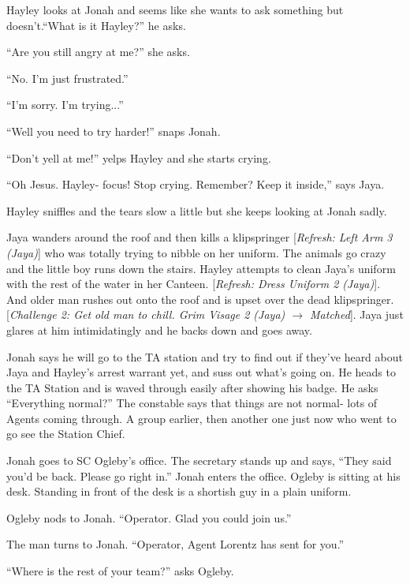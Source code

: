 Hayley looks at Jonah and seems like she wants to ask something but doesn't.``What is it Hayley?'' he asks.

``Are you still angry at me?'' she asks.

``No.  I'm just frustrated.''

``I'm sorry.  I'm trying...''

``Well you need to try harder!'' snaps Jonah.

``Don't yell at me!'' yelps Hayley and she starts crying.

``Oh Jesus.  Hayley- focus!  Stop crying.  Remember?  Keep it inside,'' says Jaya.

Hayley sniffles and the tears slow a little but she keeps looking at Jonah sadly.



Jaya wanders around the roof and then kills a klipspringer {[}\textit{Refresh: Left Arm 3 (Jaya)}{]} who was totally trying to nibble on her uniform.  The animals go crazy and the little boy runs down the stairs.  Hayley attempts to clean Jaya's uniform with the rest of the water in her Canteen.  {[}\textit{Refresh: Dress Uniform 2 (Jaya)}{]}. And older man rushes out onto the roof and is upset over the dead klipspringer.   {[}\textit{Challenge 2: Get old man to chill.  Grim Visage 2 (Jaya) $\rightarrow$ Matched}{]}.  Jaya just glares at him intimidatingly and he backs down and goes away.



Jonah says he will go to the TA station and try to find out if they've heard about Jaya and Hayley's arrest warrant yet, and suss out what's going on.  He heads to the TA Station and is waved through easily after showing his badge.  He asks ``Everything normal?''  The constable says that things are not normal- lots of Agents coming through.  A group earlier, then another one just now who went to go see the Station Chief.



Jonah goes to SC Ogleby's office.  The secretary stands up and says, ``They said you'd be back.  Please go right in.''  Jonah enters the office.  Ogleby is sitting at his desk.  Standing in front of the desk is a shortish guy in a plain uniform.  

Ogleby nods to Jonah.  ``Operator.  Glad you could join us.''

The man turns to Jonah.  ``Operator, Agent Lorentz has sent for you.''

``Where is the rest of your team?'' asks Ogleby.

